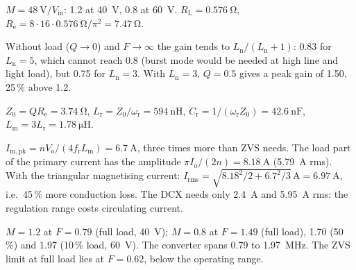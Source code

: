 \begin{solutionblock}
	$M=\SI{48}{\volt}/V_\mathrm{in}$: 1.2 at \SI{40}{\volt}, 0.8 at \SI{60}{\volt}. $R_\mathrm{L}=\SI{0.576}{\ohm}$, $R_\mathrm{e}=8\cdot16\cdot\SI{0.576}{\ohm}/\pi^2=\SI{7.47}{\ohm}$.
\end{solutionblock}


\begin{solutionblock}
	Without load ($Q\to0$) and $F\to\infty$ the gain tends to $L_\mathrm{n}/(L_\mathrm{n}+1)$: 0.83 for $L_\mathrm{n}=5$, which cannot reach 0.8 (burst mode would be needed at high line and light load), but 0.75 for $L_\mathrm{n}=3$. With $L_\mathrm{n}=3$, $Q=0.5$ gives a peak gain of 1.50, 25\,\% above 1.2.
\end{solutionblock}


\begin{solutionblock}
	$Z_0=QR_\mathrm{e}=\SI{3.74}{\ohm}$, $L_\mathrm{r}=Z_0/\omega_\mathrm{r}=\SI{594}{\nano\henry}$, $C_\mathrm{r}=1/(\omega_\mathrm{r}Z_0)=\SI{42.6}{\nano\farad}$, $L_\mathrm{m}=3L_\mathrm{r}=\SI{1.78}{\micro\henry}$.
\end{solutionblock}


\begin{solutionblock}
	$I_\mathrm{m,pk}=nV_\mathrm{o}/(4f_\mathrm{r}L_\mathrm{m})=\SI{6.7}{\ampere}$, three times more than ZVS needs. The load part of the primary current has the amplitude $\pi I_\mathrm{o}/(2n)=\SI{8.18}{\ampere}$ (\SI{5.79}{\ampere} rms). With the triangular magnetising current: $I_\mathrm{rms}=\sqrt{8.18^2/2+6.7^2/3}\,\si{\ampere}=\SI{6.97}{\ampere}$, i.e.\ 45\,\% more conduction loss. The DCX needs only \SI{2.4}{\ampere} and \SI{5.95}{\ampere} rms: the regulation range costs circulating current.
\end{solutionblock}


\begin{solutionblock}
	$M=1.2$ at $F=0.79$ (full load, \SI{40}{\volt}); $M=0.8$ at $F=1.49$ (full load), 1.70 (50\,\%) and 1.97 (10\,\% load, \SI{60}{\volt}). The converter spans 0.79 to \SI{1.97}{\mega\hertz}. The ZVS limit at full load lies at $F=0.62$, below the operating range.
\end{solutionblock}

